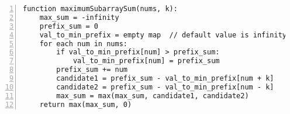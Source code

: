\begin{figure*}
\centering
\begin{lstlisting}[breaklines=true, frame=shadowbox, numbers=left,]
function maximumSubarraySum(nums, k):
    max_sum = -infinity
    prefix_sum = 0
    val_to_min_prefix = empty map  // default value is infinity
    for each num in nums:
        if val_to_min_prefix[num] > prefix_sum:
            val_to_min_prefix[num] = prefix_sum
        prefix_sum += num
        candidate1 = prefix_sum - val_to_min_prefix[num + k]
        candidate2 = prefix_sum - val_to_min_prefix[num - k]
        max_sum = max(max_sum, candidate1, candidate2)
    return max(max_sum, 0)
\end{lstlisting}
\label{lst:pseudo-wrong-condition}
\end{figure*}
